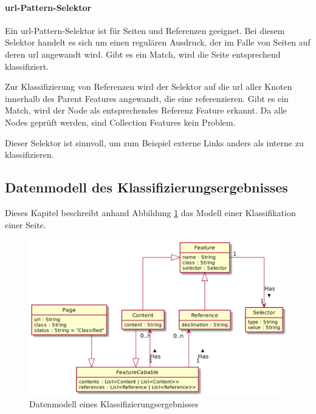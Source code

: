         \paragraph{\gls{url}-Pattern-Selektor}
        Ein \gls{url}-Pattern-Selektor ist für Seiten und Referenzen geeignet.
        Bei diesem Selektor handelt es sich um einen regulären Ausdruck,
        der im Falle von Seiten auf deren \gls{url} angewandt wird.
        Gibt es ein Match, wird die Seite entsprechend klassifiziert.
        
        Zur Klassifizierung von Referenzen wird der Selektor auf die \gls{url} aller Knoten
        innerhalb des Parent Features angewandt, die eine {\resource} referenzieren.
        Gibt es ein Match, wird der Node als entsprechendes Referenz Feature erkannt.
        Da alle Nodes geprüft werden, sind Collection Features kein Problem.

        Dieser Selektor ist sinnvoll, um zum Beispiel externe Links anders als interne zu klassifizieren.

    \subsection{Datenmodell des Klassifizierungsergebnisses}
        \label{section:conceptPageDataModel}
        Dieses Kapitel beschreibt anhand Abbildung \ref{image:conceptPageDataModel}
        das Modell einer Klassifikation einer Seite.

        \begin{figure}[htb]
            \centering
            \includegraphics[scale=\imageScalingFactor]{../resources/concept/page.png}
            \caption{Datenmodell eines Klassifizierungsergebnisses}
            \label{image:conceptPageDataModel}
        \end{figure}

